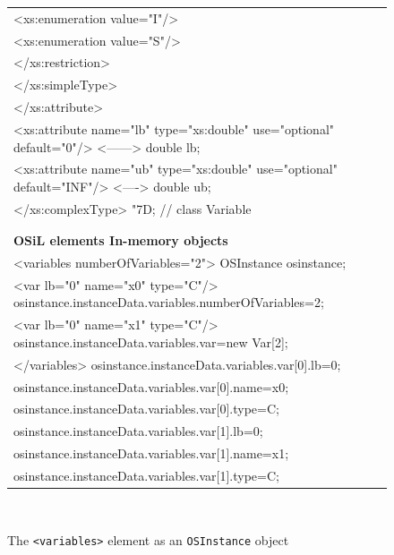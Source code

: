 \documentclass[11pt]{article}
\newcommand{\Sa}{8pt}
\newcommand{\Sb}{0pt}
\renewcommand{\_}{{\char"5F}}
\renewcommand{\{}{{\char"7B}}
\renewcommand{\}}{{\char"7D}}
\renewcommand{\^}{{\char"0D}}
\renewcommand{\'}{{\char"0D}}
\begin{document}
\begin{enumerate}[Step 1:]
\begin{figure}[hb]
{{\begin{tabular}{@{}l@{}}
        <xs:enumeration value="I"/>\\[\Sb]
        <xs:enumeration value="S"/>\\[\Sb]
      </xs:restriction>\\[\Sb]
    </xs:simpleType>\\[\Sb]
  </xs:attribute>\\[\Sb]
  <xs:attribute name="lb" type="xs:double" use="optional" default="0"/>  <------>    double lb;\\[\Sb]
  <xs:attribute name="ub" type="xs:double" use="optional" default="INF"/>  <---->    double ub;\\[\Sb]
</xs:complexType>                                                                  \}; // class Variable\\[\Sb]
 \\[\Sb]
 \\[\Sb]
\textsf{\textbf{OSiL elements          \hspace{1.97in}  In-memory objects}}\\[\Sa]
<variables numberOfVariables="2">                   OSInstance osinstance;\\[\Sb]
   <var lb="0" name="x0" type="C"/>                 osinstance.instanceData.variables.numberOfVariables=2;\\[\Sb]
   <var lb="0" name="x1" type="C"/>                 osinstance.instanceData.variables.var=new Var[2];\\[\Sb]
</variables>                                        osinstance.instanceData.variables.var[0].lb=0;\\[\Sb]
                                                    osinstance.instanceData.variables.var[0].name=x0;\\[\Sb]
                                                    osinstance.instanceData.variables.var[0].type=C;\\[\Sb]
                                                    osinstance.instanceData.variables.var[1].lb=0;\\[\Sb]
                                                    osinstance.instanceData.variables.var[1].name=x1;\\[\Sb]
                                                    osinstance.instanceData.variables.var[1].type=C;
\end{tabular} }} \medskip\\[\Sb]
\caption{The {\tt <variables>} element as an {\tt OSInstance} object} \label{figure:osinstancevariables}
\end{figure}



\end{enumerate}
\end{document}
